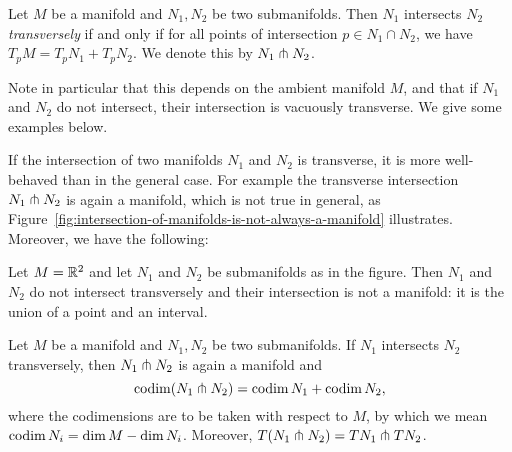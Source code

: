 \begin{definition}[Transversality]
    Let $M$ be a manifold and $N_1, N_2$ be two submanifolds.
    Then $N_1$ intersects $N_2$ \emph{transversely} if and only if for all points of intersection $p \in N_1 \cap N_2$, we have
    $T_pM = T_pN_1 + T_p N_2$.
    We denote this by $ N_1 \pitchfork N_2$.\sidenotemark
\end{definition}
Note in particular that this depends on the ambient manifold $M$, and that if $N_1$ and $N_2$ do not intersect, their intersection is vacuously transverse.
We give some examples below.
\begin{figure}[H]
    \centering
\end{figure}
If the intersection of two manifolds $ N_1$ and $N_2$ is transverse, it is more well-behaved than in the general case.
For example the transverse intersection $N_1 \pitchfork N_2$ is again a manifold, which is not true in general, as Figure~\ref{fig:intersection-of-manifolds-is-not-always-a-manifold} illustrates.
Moreover, we have the following:
\begin{marginfigure}
    \centering
    \caption{Let $M = \mathbb{R}^2$ and let $N_1$ and $N_2$ be submanifolds as in the figure. Then $N_1$ and $N_2$ do not intersect transversely and their intersection is not a manifold: it is the union of a point and an interval.}
    \label{fig:intersection-of-manifolds-is-not-always-a-manifold}
\end{marginfigure}
\begin{prop}
    Let $M$ be a manifold and $N_1, N_2$ be two submanifolds. If $N_1$ intersects $N_2$ transversely, then $ N_1 \pitchfork N_2$ is again a manifold and 
    \[
        \operatorname{codim} (N_1 \pitchfork N_2) = \operatorname{codim} N_1 + \operatorname{codim} N_2
    ,\] 
    where the codimensions are to be taken with respect to $M$, by which we mean $\operatorname{codim} N_i = \dim M - \dim N_i$.
    Moreover, $T(N_1\pitchfork N_2) = TN_1 \pitchfork TN_2$.
\label{prop:transverse-codimensions-add}
\end{prop}
